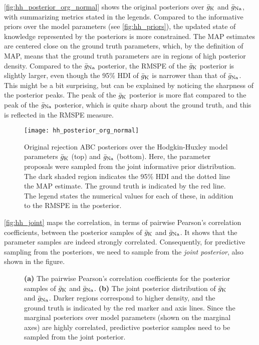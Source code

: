 \autoref{fig:hh_posterior_org_normal} shows the original posteriors over $\bar{g}_{\mathrm{K}}$ and $\bar{g}_{\mathrm{Na}}$, with summarizing metrics stated in the legends. Compared to the informative priors over the model parameters (see \autoref{fig:hh_priors}), the updated state of knowledge represented by the posteriors is more constrained. The MAP estimates are centered close on the ground truth parameters, which, by the definition of MAP, means that the ground truth parameters are in regions of high posterior density. Compared to the $\bar{g}_{\mathrm{Na}}$ posterior, the RMSPE of the $\bar{g}_{\mathrm{K}}$ posterior is slightly larger, even though the 95\% HDI of $\bar{g}_{\mathrm{K}}$ is narrower than that of $\bar{g}_{\mathrm{Na}}$. This might be a bit surprising, but can be explained by noticing the sharpness of the posterior peaks. The peak of the $\bar{g}_{\mathrm{K}}$ posterior is more flat compared to the peak of the $\bar{g}_{\mathrm{Na}}$ posterior, which is quite sharp about the ground truth, and this is reflected in the RMSPE measure.
\begin{figure}[H]
    \centering
    \texttt{[image: hh\_posterior\_org\_normal]}
    \caption{Original rejection ABC posteriors over the Hodgkin-Huxley model parameters $\bar{g}_{\mathrm{K}}$ (top) and $\bar{g}_{\mathrm{Na}}$ (bottom). Here, the parameter proposals were sampled from the joint informative prior distribution. The dark shaded region indicates the 95\% HDI and the dotted line the MAP estimate. The ground truth is indicated by the red line. The legend states the numerical values for each of these, in addition to the RMSPE in the posterior.}
    \label{fig:hh_posterior_org_normal}
\end{figure}

\autoref{fig:hh_joint} maps the correlation, in terms of pairwise Pearson's correlation coefficients, between the posterior samples of $\bar{g}_{\mathrm{K}}$ and $\bar{g}_{\mathrm{Na}}$. It shows that the parameter samples are indeed strongly correlated. Consequently, for predictive sampling from the posteriors, we need to sample from the \textit{joint posterior}, also shown in the figure.
\begin{figure}[!htb]
\centering
{}
\qquad
{}
\caption{\textbf{(a)} The pairwise Pearson's correlation coefficients for the posterior samples of $\bar{g}_{\mathrm{K}}$ and $\bar{g}_{\mathrm{Na}}$. \textbf{(b)} The joint posterior distribution of $\bar{g}_{\mathrm{K}}$ and $\bar{g}_{\mathrm{Na}}$. Darker regions correspond to higher density, and the ground truth is indicated by the red marker and axis lines. Since the marginal posteriors over model parameters (shown on the marginal axes) are highly correlated, predictive posterior samples need to be sampled from the joint posterior. 
}
\label{fig:hh_joint}
\end{figure}

